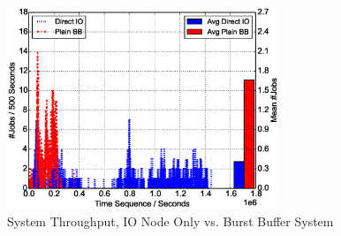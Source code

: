 \begin{figure}[!t]
        \centering
        \includegraphics[width=3.2in]{DrawDirectIOvsBB/1000jobs_direct_vs_bb_throughput}
        \caption{System Throughput, IO Node Only vs. Burst Buffer System}
        \label{Fig:DirectIOvsBBThroughput}
\end{figure}

